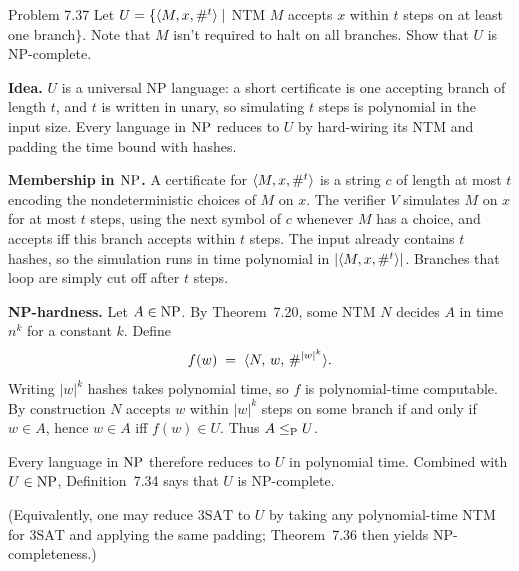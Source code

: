 \providecommand{\SAT}{\mathrm{SAT}}
\providecommand{\threesat}{\mathrm{3SAT}}
\providecommand{\CLIQUE}{\mathrm{CLIQUE}}
\providecommand{\PATHL}{\mathrm{PATH}}
\providecommand{\TIME}{\mathrm{TIME}}
\providecommand{\DP}{\mathrm{DP}}

\begin{question}{Problem 7.37}
Let $U=\{\langle M,x,\#^t\rangle\mid$ NTM $M$ accepts $x$ within $t$ steps on at least one branch$\}$.
Note that $M$ isn't required to halt on all branches. Show that $U$ is NP-complete.
\end{question}
\begin{soln}
\textbf{Idea.} $U$ is a universal NP language: a short certificate is one accepting branch of length $t$, and $t$ is written in unary, so simulating $t$ steps is polynomial in the input size. Every language in $\mathrm{NP}$ reduces to $U$ by hard-wiring its NTM and padding the time bound with hashes.

\textbf{Membership in $\mathrm{NP}$.}
A certificate for $\langle M,x,\#^t\rangle$ is a string $c$ of length at most $t$ encoding the nondeterministic choices of $M$ on $x$. The verifier $V$ simulates $M$ on $x$ for at most $t$ steps, using the next symbol of $c$ whenever $M$ has a choice, and accepts iff this branch accepts within $t$ steps. The input already contains $t$ hashes, so the simulation runs in time polynomial in $\lvert\langle M,x,\#^t\rangle\rvert$. Branches that loop are simply cut off after $t$ steps.

\textbf{NP-hardness.}
Let $A\in\mathrm{NP}$. By Theorem~7.20, some NTM $N$ decides $A$ in time $n^k$ for a constant $k$. Define
\[
f(w)\;=\;\langle N,\,w,\,\#^{\lvert w\rvert^k}\rangle.
\]
Writing $\lvert w\rvert^k$ hashes takes polynomial time, so $f$ is polynomial-time computable. By construction $N$ accepts $w$ within $\lvert w\rvert^k$ steps on some branch if and only if $w\in A$, hence $w\in A$ iff $f(w)\in U$. Thus $A\le_{\mathrm{P}} U$.

Every language in $\mathrm{NP}$ therefore reduces to $U$ in polynomial time. Combined with $U\in\mathrm{NP}$, Definition~7.34 says that $U$ is NP-complete.

(Equivalently, one may reduce $\threesat$ to $U$ by taking any polynomial-time NTM for $\threesat$ and applying the same padding; Theorem~7.36 then yields NP-completeness.)
\end{soln}

